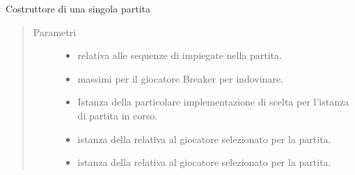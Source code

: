 \documentclass[letterpaper,10pt,italian,openany,oneside]{sphinxmanual}
\begin{document}
\begin{fulllineitems}
\label{\detokenize{source/it/unicam/cs/pa/mastermind/gamecore/SingleMatch:it.unicam.cs.pa.mastermind.gamecore.SingleMatch.SingleMatch(int, int, GameViewFactory, BreakerFactory, MakerFactory)}}
Costruttore di una singola partita
\begin{quote}\begin{description}
\item[{Parametri}] \leavevmode\begin{itemize}
\item {} 
 \textendash{} relativa alle sequenze di  impiegate nella partita.

\item {} 
 \textendash{} massimi per il giocatore Breaker per indovinare.

\item {} 
 \textendash{} Istanza della particolare implementazione di  scelta per l’istanza di partita in corso.

\item {} 
 \textendash{} istanza della  relativa al giocatore  selezionato per la partita.

\item {} 
 \textendash{} istanza della  relativa al giocatore  selezionato per la partita.

\end{itemize}

\end{description}\end{quote}

\end{fulllineitems}
\end{document}
